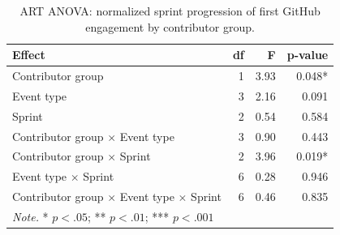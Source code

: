 \begin{table}[ht]
\centering
\footnotesize
\caption{ART ANOVA: normalized sprint progression of first GitHub engagement by contributor group.}
\label{tab:anova_first_git}
\begin{tabular}{l r r r}
\toprule
\textbf{Effect} & \textbf{df} & \textbf{F} & \textbf{p-value} \\
\midrule
Contributor group & 1 & 3.93 & 0.048* \\
Event type & 3 & 2.16 & 0.091 \\
Sprint & 2 & 0.54 & 0.584 \\
Contributor group $\times$ Event type & 3 & 0.90 & 0.443 \\
Contributor group $\times$ Sprint & 2 & 3.96 & 0.019* \\
Event type $\times$ Sprint & 6 & 0.28 & 0.946 \\
Contributor group $\times$ Event type $\times$ Sprint & 6 & 0.46 & 0.835 \\
\midrule
\multicolumn{4}{l}{\textit{Note.} * $p < .05$; ** $p < .01$; *** $p < .001$} \\
\bottomrule
\end{tabular}
\end{table}
